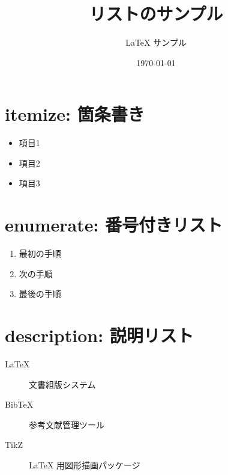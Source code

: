 \documentclass[lualatex,ja=standard]{bxjsarticle}
\title{リストのサンプル}
\author{LaTeX サンプル}
\date{\today}
\begin{document}
\maketitle

\section{itemize: 箇条書き}

\begin{itemize}
  \item 項目1
  \item 項目2
  \item 項目3
\end{itemize}

\section{enumerate: 番号付きリスト}

\begin{enumerate}
  \item 最初の手順
  \item 次の手順
  \item 最後の手順
\end{enumerate}

\section{description: 説明リスト}

\begin{description}
  \item[LaTeX]  文書組版システム
  \item[BibTeX] 参考文献管理ツール
  \item[TikZ]   LaTeX 用図形描画パッケージ
\end{description}

\end{document}
